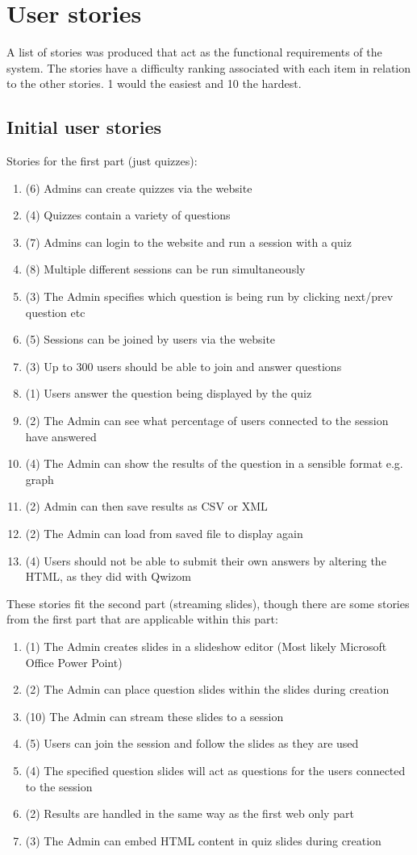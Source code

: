 \chapter{User stories}
A list of stories was produced that act as the functional requirements of the system. The stories have a difficulty ranking associated with each item in relation to the other stories. 1 would the easiest and 10 the hardest.

\section{Initial user stories}
\label{appendix:initial-stories}
Stories for the first part (just quizzes):
\begin{enumerate}
	\item (6) Admins can create quizzes via the website
	\item (4) Quizzes contain a variety of questions
	\item (7) Admins can login to the website and run a session with a quiz
	\item (8) Multiple different sessions can be run simultaneously
	\item (3) The Admin specifies which question is being run by clicking next/prev question etc
	\item (5) Sessions can be joined by users via the website
	\item (3) Up to 300 users should be able to join and answer questions
	\item (1) Users answer the question being displayed by the quiz
	\item (2) The Admin can see what percentage of users connected to the session have answered
	\item (4) The Admin can show the results of the question in a sensible format e.g. graph
	\item (2) Admin can then save results as CSV or XML
	\item (2) The Admin can load from saved file to display again
	\item (4) Users should not be able to submit their own answers by altering the HTML, as they did with Qwizom
\end{enumerate}
These stories fit the second part (streaming slides), though there are some stories from the first part that are applicable within this part:
\begin{enumerate}
	\item (1) The Admin creates slides in a slideshow editor (Most likely Microsoft Office Power Point)
	\item (2) The Admin can place question slides within the slides during creation
	\item (10) The Admin can stream these slides to a session
	\item (5) Users can join the session and follow the slides as they are used	
	\item (4) The specified question slides will act as questions for the users connected to the session
	\item (2) Results are handled in the same way as the first web only part
	\item (3) The Admin can embed HTML content in quiz slides during creation
\end{enumerate}

